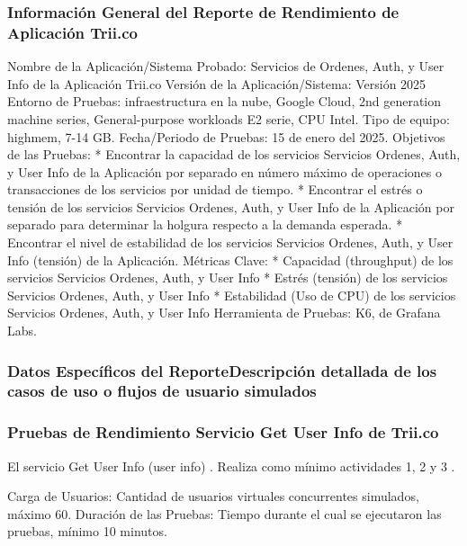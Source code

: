 \documentclass[
  paper=a4,
  ,captions=tableheading
]{scrartcl}
\begin{document}
\subsubsection{Información General del Reporte de Rendimiento de
Aplicación
Trii.co}\label{sec:informaciuxf3n-general-del-reporte-de-rendimiento-de-aplicaciuxf3n-trii.co}

Nombre de la Aplicación/Sistema Probado: Servicios de Ordenes, Auth, y
User Info de la Aplicación Trii.co Versión de la Aplicación/Sistema:
Versión 2025 Entorno de Pruebas: infraestructura en la nube, Google
Cloud, 2nd generation machine series, General-purpose workloads E2
serie, CPU Intel. Tipo de equipo: highmem, 7-14 GB. Fecha/Periodo de
Pruebas: 15 de enero del 2025. Objetivos de las Pruebas: * Encontrar la
capacidad de los servicios Servicios Ordenes, Auth, y User Info de la
Aplicación por separado en número máximo de operaciones o transacciones
de los servicios por unidad de tiempo. * Encontrar el estrés o tensión
de los servicios Servicios Ordenes, Auth, y User Info de la Aplicación
por separado para determinar la holgura respecto a la demanda esperada.
* Encontrar el nivel de estabilidad de los servicios Servicios Ordenes,
Auth, y User Info (tensión) de la Aplicación. Métricas Clave: *
Capacidad (throughput) de los servicios Servicios Ordenes, Auth, y User
Info * Estrés (tensión) de los servicios Servicios Ordenes, Auth, y User
Info * Estabilidad (Uso de CPU) de los servicios Servicios Ordenes,
Auth, y User Info Herramienta de Pruebas: K6, de Grafana Labs.

\subsubsection{Datos Específicos del ReporteDescripción detallada de los
casos de uso o flujos de usuario
simulados}\label{sec:datos-especuxedficos-del-reportedescripciuxf3n-detallada-de-los-casos-de-uso-o-flujos-de-usuario-simulados}

\subsubsection{Pruebas de Rendimiento Servicio Get User Info de
Trii.co}\label{sec:pruebas-de-rendimiento-servicio-get-user-info-de-trii.co}

El servicio Get User Info (user info) . Realiza como mínimo actividades
1, 2 y 3 .

Carga de Usuarios: Cantidad de usuarios virtuales concurrentes
simulados, máximo 60. Duración de las Pruebas: Tiempo durante el cual se
ejecutaron las pruebas, mínimo 10 minutos.
\end{document}

